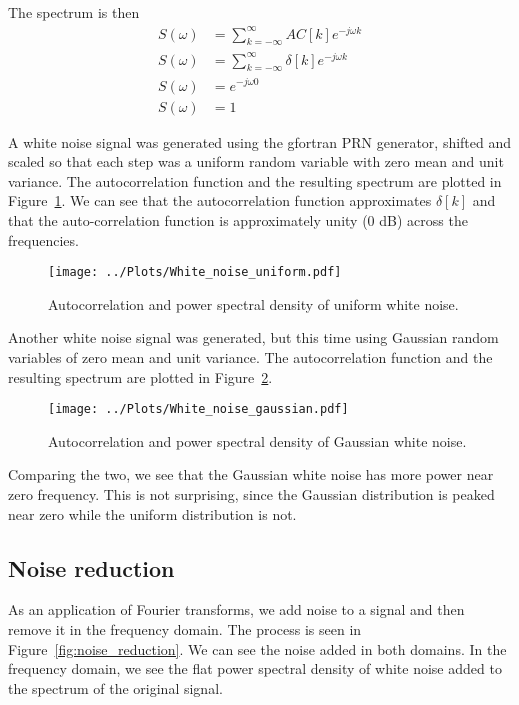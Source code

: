 \documentclass[twocolumn]{myarticle}
\begin{document}
The spectrum is then
\begin{align}
    S(\omega) &= \sum_{k = -\infty}^{\infty} AC[k] e^{-j \omega k}
    \\
    S(\omega) &= \sum_{k = -\infty}^{\infty} \delta[k] e^{-j \omega k}
    \\
    S(\omega) &= e^{-j \omega 0}
    \\
    S(\omega) &= 1
\end{align}

A white noise signal was generated using the gfortran PRN generator, shifted and scaled so that each step was a uniform random variable with zero mean and unit variance.
The autocorrelation function and the resulting spectrum are plotted in Figure~\ref{fig:white_noise_uniform}.
We can see that the autocorrelation function approximates $ \delta[k] $ and that the auto-correlation function is approximately unity (0 dB) across the frequencies.

\begin{figure}[htb]
    \centering
    \texttt{[image: ../Plots/White\_noise\_uniform.pdf]}
    \caption{Autocorrelation and power spectral density of uniform white noise.}
    \label{fig:white_noise_uniform}
\end{figure}

Another white noise signal was generated, but this time using Gaussian random variables of zero mean and unit variance.
The autocorrelation function and the resulting spectrum are plotted in Figure~\ref{fig:white_noise_gaussian}.

\begin{figure}[htb]
    \centering
    \texttt{[image: ../Plots/White\_noise\_gaussian.pdf]}
    \caption{Autocorrelation and power spectral density of Gaussian white noise.}
    \label{fig:white_noise_gaussian}
\end{figure}

Comparing the two, we see that the Gaussian white noise has more power near zero frequency.
This is not surprising, since the Gaussian distribution is peaked near zero while the uniform distribution is not.

\subsection{Noise reduction}
\label{subsec:noise_reduction}

As an application of Fourier transforms, we add noise to a signal and then remove it in the frequency domain.
The process is seen in Figure~\ref{fig:noise_reduction}.
We can see the noise added in both domains.
In the frequency domain, we see the flat power spectral density of white noise added to the spectrum of the original signal.
\end{document}
